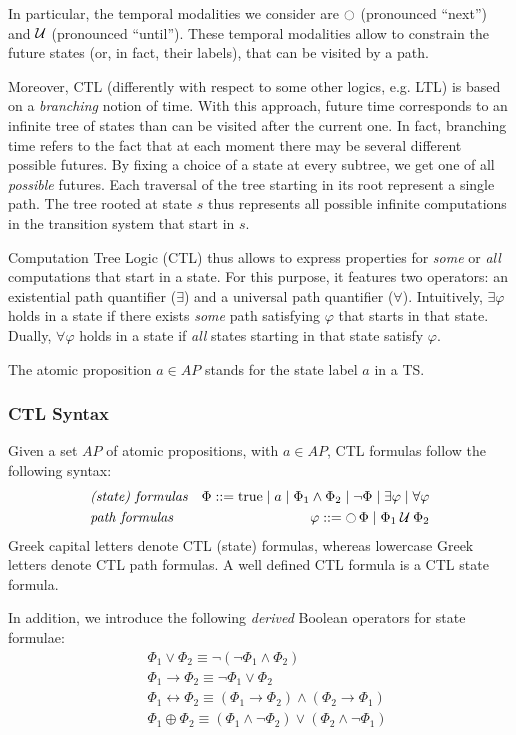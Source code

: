 \documentclass{article}
\begin{document}
In particular, the temporal modalities we consider are $\ocircle$ (pronounced ``next'') and $\mathbin{\mathcal{U}}$ (pronounced ``until'').
These temporal modalities allow to constrain the future states (or, in fact, their labels), that can be visited by a path.

Moreover, CTL (differently with respect to some other logics, e.g. LTL) is based on a \emph{branching} notion of time. With this approach, future time corresponds to an infinite tree of states than can be visited after the current one. In fact, branching time refers to the fact that at each moment there may be several different possible futures. By fixing a choice of a state at every subtree, we get one of all \emph{possible} futures. 
Each traversal of the tree starting in its root represent a single path. The tree rooted at state $s$ thus represents all possible infinite computations in the transition system that start in $s$.

Computation Tree Logic (CTL) thus allows to express properties for \emph{some} or \emph{all} computations that start in a state. For this purpose, it features two operators: an existential path quantifier ($\exists$) and a universal path quantifier ($\forall$). Intuitively, $\exists \varphi$ holds in a state if there exists \emph{some} path satisfying $\varphi$ that starts in that state. Dually, $\forall \varphi$ holds in a state if \emph{all} states starting in that state satisfy $\varphi$.

The atomic proposition $a \in AP$ stands for the state label $a$ in a TS.

\subsubsection*{CTL Syntax}
Given a set $AP$ of atomic propositions, with $a \in AP$, CTL formulas follow the following syntax: 
\begin{align*}
    & \emph{(state) formulas} & \Phi ::= \text{true} \mid a \mid \Phi_1 \land \Phi_2 \mid \neg \Phi \mid \exists \varphi \mid \forall \varphi \\
    & \emph{path formulas}    & \varphi ::= \mathop{\ocircle}{\Phi} \mid \Phi_1 \mathbin{\mathcal{U}} \Phi_2
\end{align*}
Greek capital letters denote CTL (state) formulas, whereas lowercase Greek letters denote CTL path formulas. 
A well defined CTL formula is a CTL state formula.

In addition, we introduce the following \emph{derived} Boolean operators for state formulae: 
\begin{align*}
    &\; \Phi_1 \lor \Phi_2 \equiv \neg (\neg \Phi_1 \land \Phi_2) \\
    &\; \Phi_1 \rightarrow \Phi_2 \equiv \neg \Phi_1 \lor \Phi_2 \\
    &\; \Phi_1 \leftrightarrow  \Phi_2 \equiv (\Phi_1 \rightarrow \Phi_2) \land (\Phi_2 \rightarrow \Phi_1) \\
    &\; \Phi_1 \oplus  \Phi_2 \equiv (\Phi_1 \land \neg \Phi_2) \lor (\Phi_2 \land \neg \Phi_1)\\
\end{align*}
\end{document}
